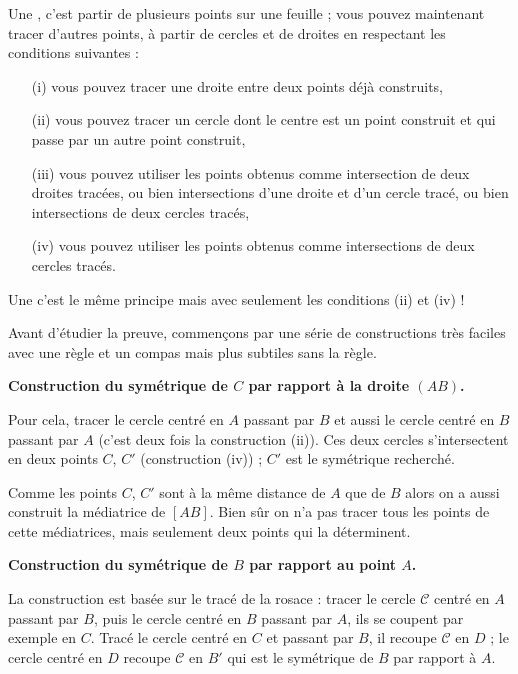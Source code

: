 \documentclass[11pt,class=report,crop=false]{standalone}
\begin{document}
Une , c'est partir de plusieurs points sur une
feuille ; vous pouvez maintenant tracer d’autres points, à partir de cercles et de droites en respectant les conditions
suivantes :
\begin{itemize}
  \item[(i)] vous pouvez tracer une droite entre deux points déjà construits,
  \item[(ii)]vous pouvez tracer un cercle dont le centre est un point construit et qui passe par un autre point construit,
  \item[(iii)] vous pouvez utiliser les points obtenus comme intersection de deux droites tracées, ou bien intersections d’une
droite et d’un cercle tracé, ou bien intersections de deux cercles tracés,
  \item[(iv)] vous pouvez utiliser les points obtenus comme intersections de deux cercles tracés.
\end{itemize}

Une  c'est le même principe mais avec seulement les conditions
(ii) et (iv) !

\bigskip

Avant d'étudier la preuve, commençons par une série de constructions très faciles avec une règle et un compas mais plus subtiles sans la règle.

\textbf{Construction du symétrique de $C$ par rapport à la droite $(AB)$.}

Pour cela, tracer le cercle
centré en $A$ passant par $B$ et aussi le cercle centré en $B$ passant par $A$ (c'est deux fois la construction (ii)). Ces deux cercles s’intersectent en deux
points $C$, $C'$ (construction (iv)) ; 
$C'$ est le symétrique recherché.

Comme les points $C$, $C'$ sont à la même distance de $A$ que de $B$ alors on a aussi construit la médiatrice de $[AB]$.
Bien sûr on n'a pas tracer tous les points de cette médiatrices, mais seulement deux points qui la déterminent.


\bigskip
\textbf{Construction du symétrique de $B$ par rapport au point $A$.}

La construction est basée sur le tracé de la rosace : tracer le cercle $\mathcal{C}$
centré en $A$ passant par $B$, puis le cercle centré en $B$ passant par $A$, 
ils se coupent par exemple en $C$. Tracé le cercle centré en $C$ et passant par $B$,
il recoupe $\mathcal{C}$ en $D$ ; le cercle centré en $D$ recoupe $\mathcal{C}$ en $B'$ qui est le symétrique de
$B$ par rapport à $A$. 
\end{document}
